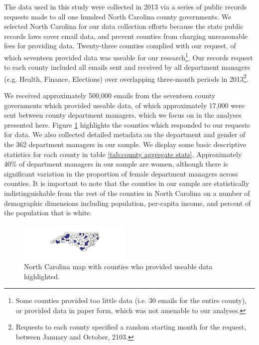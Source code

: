 \documentclass{pnastwo}
\begin{document}
\begin{article}
The data used in this study were collected in 2013 via a series of public records requests made to all one hundred North Carolina county governments. We selected North Carolina for our data collection efforts because the state public records laws cover email data, and prevent counties from charging unreasonable fees for providing data. Twenty-three counties complied with our request, of which seventeen provided data was useable for our research\footnote{Some counties provided too little data (i.e. 30 emails for the entire county), or provided data in paper form, which was not amenable to our analyses.}. Our records request to each county included all emails sent and received by all department managers (e.g. Health, Finance, Elections) over overlapping three-month periods in 2013\footnote{Requests to each county specified a random starting month for the request, between January and October, 2103.}. 

We received approximately 500,000 emails from the seventeen county governments which provided useable data, of which approximately 17,000 were sent between county department managers, which we focus on in the analyses presented here. Figure \ref{fig:nc map} highlights the counties which responded to our requests for data. We also collected detailed metadata on the department and gender of the 362 department managers in our sample. We display some basic descriptive statistics for each county in table \ref{tab:county aggregate stats}. Approximately 40\% of department managers in our sample are women, although there is significant variation in the proportion of female department managers across counties. It is important to note that the counties in our sample are statistically indistinguishable from the rest of the counties in North Carolina on a number of demographic dimensions including population, per-capita income, and percent of the population that is white.


	\begin{figure}
		\centering
	\caption{\label{fig:nc map} North Carolina map with counties who provided useable data highlighted.}	
	\centering
	\includegraphics[width = 0.48\textwidth]{images/County_Map.pdf}
	\end{figure}
	

\end{article}
\end{document}
